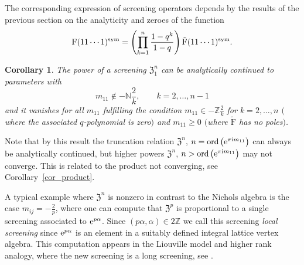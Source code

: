 \documentclass[10pt,a4paper]{amsart}
\numberwithin{equation}{section}
\newtheorem{cor}[teo]{Corollary}
\newcommand{\N}{\mathbb{N}}
\newcommand{\Z}{\mathbb{Z}}
\renewcommand{\i}{\mathrm{i}}
\newcommand{\zem}{\mathfrak{Z}}
\newcommand{\Fp}{\mathrm{F}}
\newcommand{\rFp}{\tilde{\mathrm{F}}}
\begin{document}
The corresponding expression of screening operators depends by the results of the previous section on the analyticity and zeroes of the function
\[
\Fp(11\cdots1)^{{\rm sym}}=\left(\prod_{k=1}^n\frac{1-q^k}{1-q} \right)\rFp(11\cdots1)^{{\rm sym}}.
\]

\begin{cor}\label{cor_trun}
The power of a screening $\zem_1^n$ can be analytically continued to parameters with
\[m_{11}\not\in -\N\frac{2}{k},\qquad k=2,\dots, n-1\]
and it vanishes for all $m_{11}$ fulfilling the condition $m_{11}\in -\Z\frac{2}{k}$ for $k=2,\dots, n$ $($where the associated $q$-polynomial is zero$)$ and $m_{11}\geq 0$ $($where $\rFp$ has no poles$)$.
\end{cor}
Note that by this result the truncation relation $\zem^n$, $n=\operatorname{ord}\big({\rm e}^{\pi\i m_{11}}\big)$ can always be analytically continued, but higher powers $\zem^n$, $n>\operatorname{ord}\big({\rm e}^{\pi\i m_{11}}\big)$ may not converge. This is related to the product not converging, see Corollary~\ref{cor_product}.

A typical example where $\zem^n$ is nonzero in contrast to the Nichols algebra is the case $m_{ij}=-\frac{2}{p}$, where one can compute that $\zem^p$ is proportional to a single screening associated to ${\rm e}^{p\alpha}$. Since $(p\alpha,\alpha)\in 2\Z$ we call this screening \emph{local screening} since ${\rm e}^{p\alpha}$ is an element in a suitably defined integral lattice vertex algebra. This computation appears in the Liouville model and higher rank analogy, where the new screening is a long screening, see \cite[Section~6.4]{Len17}.
\end{document}
